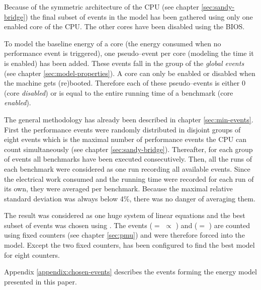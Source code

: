Because of the symmetric architecture of the CPU (see chapter
\ref{sec:sandy-bridge}) the final subset of events in the model has been
gathered using only one enabled core of the CPU. The other cores have been
disabled using the BIOS.

To model the baseline energy of a core (the energy consumed when no performance
event is triggered), one pseudo--event per core (modeling the time it is
enabled) has been added. These events fall in the group of the \emph{global
events} (see chapter \ref{sec:model-properties}). A core can only be enabled or
disabled when the machine gets (re)booted. Therefore each of these
pseudo--events is either $0$ (core \emph{disabled}) or is equal to the entire
running time of a benchmark (core \emph{enabled}).

The general methodology has already been described in chapter
\ref{sec:min-events}.  First the performance events were randomly
distributed in disjoint groups of eight events which is the maximal number of
performance events the CPU can count simultaneously (see chapter
\ref{sec:sandy-bridge}). Thereafter, for each group of events all benchmarks
have been executed consecutively. Then, all the runs of each benchmark were
considered as one run recording all available events. Since the electrical
work consumed and the running time were recorded for each run of its own, they
were averaged per benchmark. Because the maximal relative standard deviation
was always below 4\%, there was no danger of averaging them.

The result was considered as one huge system of linear equations and the best
subset of events was chosen using \JWTleaps{}. The events \JWctrCLK{} ($=$
 $\propto$
) and \JWctrINST{} ($=$
) are counted using fixed counters (see chapter
\ref{sec:pmu}) and were therefore forced into the model. Except the two fixed
counters, \JWTleaps{} has been configured to find the best model for eight
counters.

Appendix \ref{appendix:chosen-events} describes the events forming the energy
model presented in this paper.


\label{sec:final-model}

